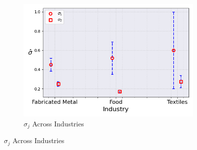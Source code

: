 \documentclass{article}
\begin{document}
\begin{figure}[ht!]
\begin{subfigure}[t]{0.32\textwidth}
        \includegraphics[width=\textwidth]{figure/stationary_normal_sigma_across_industries_m2.png}
        \caption{$\hat\sigma_j$ Across Industries}
    \end{subfigure}
\end{figure}
\end{document}
